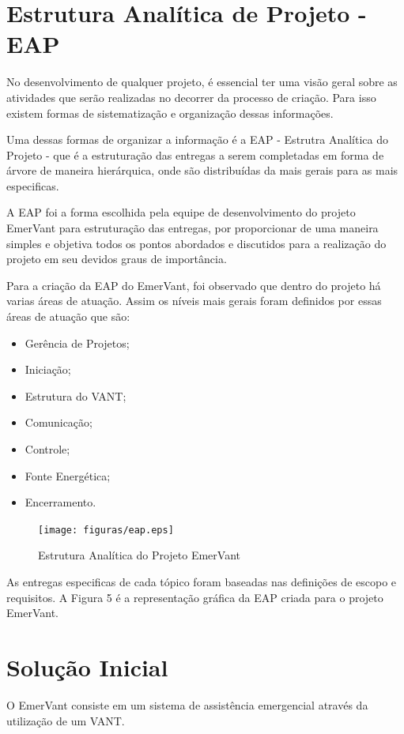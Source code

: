 \section{Estrutura Analítica de Projeto - EAP}

No desenvolvimento de qualquer projeto, é essencial ter uma visão geral sobre as atividades que serão realizadas no decorrer da processo de criação.  Para isso existem formas de sistematização e organização dessas informações.

Uma dessas formas de organizar a informação é a EAP - Estrutra Analítica do Projeto - que é a estruturação das entregas a serem completadas em forma de árvore de maneira hierárquica, onde são distribuídas da mais gerais para as mais especificas.

A EAP foi a forma escolhida pela equipe de desenvolvimento do projeto EmerVant para estruturação das entregas, por proporcionar de uma maneira simples e objetiva todos os pontos abordados e discutidos para a realização do projeto em seu devidos graus de importância. 

Para a criação da EAP do EmerVant, foi observado que dentro do projeto há varias áreas de atuação. Assim os níveis mais gerais foram definidos por essas áreas de atuação que são:
\begin{itemize}
\item Gerência de Projetos;
\item Iniciação;
\item Estrutura do VANT;
\item Comunicação;
\item Controle;
\item Fonte Energética;
\item Encerramento.
\end{itemize}

\begin{figure}[ht]
  \centering
    \texttt{[image: figuras/eap.eps]}
  \caption{Estrutura Analítica do Projeto EmerVant}
\end{figure}

As entregas especificas de cada tópico foram baseadas nas definições de escopo e requisitos. A Figura 5 é a representação gráfica da EAP criada para o projeto EmerVant.

\section{Solução Inicial}
O EmerVant consiste em um sistema de assistência emergencial através da utilização de um VANT.  


